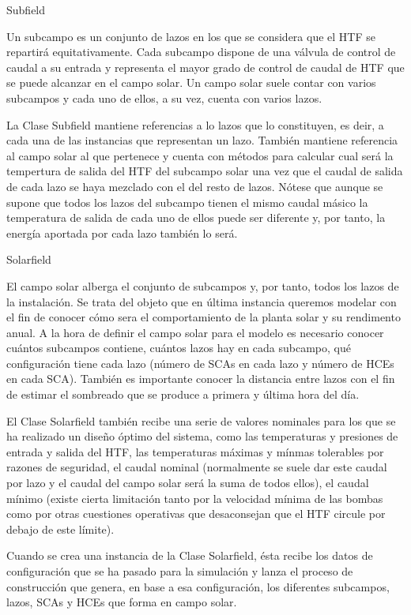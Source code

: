 \hypertarget{subfield}{Subfield}

Un subcampo es un conjunto de lazos en los que se considera que el HTF se repartirá equitativamente. Cada subcampo dispone de una válvula de control de caudal a su entrada y representa el mayor grado de control de caudal de HTF que se puede alcanzar en el campo solar. Un campo solar suele contar con varios subcampos y cada uno de ellos, a su vez, cuenta con varios lazos.  

La Clase Subfield mantiene referencias a lo lazos que lo constituyen, es deir, a cada una de las instancias que representan un lazo. También mantiene referencia al campo solar al que pertenece y cuenta con métodos para calcular cual será la tempertura de salida del HTF del subcampo solar una vez que el caudal de salida de cada lazo se haya mezclado con el del resto de lazos. Nótese que aunque se supone que todos los lazos del subcampo tienen el mismo caudal másico la temperatura de salida de cada uno de ellos puede ser diferente y, por tanto, la energía aportada por cada lazo también lo será. 

\hypertarget{solarfield}{Solarfield}

El campo solar alberga el conjunto de subcampos y, por tanto, todos los lazos de la instalación. Se trata del objeto que en última instancia queremos modelar con el fin de conocer cómo sera el comportamiento de la planta solar y su rendimento anual. A la hora de definir el campo solar para el modelo es necesario conocer cuántos subcampos contiene, cuántos lazos hay en cada subcampo, qué configuración tiene cada lazo (número de SCAs en cada lazo y número de HCEs en cada SCA). También es importante conocer la distancia entre lazos con el fin de estimar el sombreado que se produce a primera y última hora del día. 

El Clase Solarfield también recibe una serie de valores nominales para los que se ha realizado un diseño óptimo del sistema, como las temperaturas y presiones de entrada y salida del HTF, las temperaturas máximas y mínmas tolerables por razones de seguridad, el caudal nominal (normalmente se suele dar este caudal por lazo y el caudal del campo solar será la suma de todos ellos), el caudal mínimo (existe cierta limitación tanto por la velocidad mínima de las bombas como por otras
cuestiones operativas que desaconsejan que el HTF circule por debajo de este límite).

Cuando se crea una instancia de la Clase Solarfield, ésta recibe los datos de configuración que se ha pasado para la simulación y lanza el proceso de construcción que genera, en base a esa configuración, los diferentes subcampos, lazos, SCAs y HCEs que forma en campo solar.

